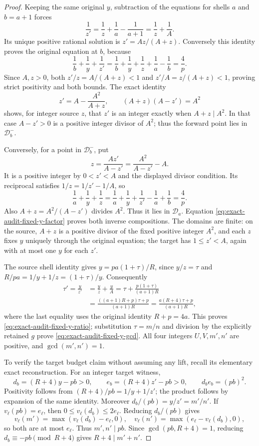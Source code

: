 \begin{proof}
Keeping the same original \(y\), subtraction of the equations for
shells \(a\) and \(b=a+1\) forces
\[
 \frac1{z'}=\frac1z+\frac1a-\frac1{a+1}
           =\frac1z+\frac1A.
\]
Its unique positive rational solution is \(z'=Az/(A+z)\).
Conversely this identity proves the original equation at \(b\),
because
\[
 \frac1b+\frac1y+\frac1{z'}
 =\frac1b+\frac1y+\frac1z+\frac1a-\frac1b=\frac4p.
\]
Since \(A,z>0\), both \(z'/z=A/(A+z)<1\) and
\(z'/A=z/(A+z)<1\), proving strict positivity and both bounds.
The exact identity
\begin{equation}\label{eq:exact-audit-fixed-y-factor}
 z'=A-\frac{A^2}{A+z},\qquad (A+z)(A-z')=A^2
\end{equation}
shows, for integer source \(z\), that \(z'\) is an integer exactly
when \(A+z\mid A^2\). In that case \(A-z'>0\) is a positive
integer divisor of \(A^2\); thus the forward point lies in
\(\mathcal D_b^-\).

Conversely, for a point in \(\mathcal D_b^-\), put
\[
 z=\frac{Az'}{A-z'}=\frac{A^2}{A-z'}-A.
\]
It is a positive integer by \(0<z'<A\) and the displayed divisor
condition. Its reciprocal satisfies \(1/z=1/z'-1/A\), so
\[
 \frac1a+\frac1y+\frac1z
 =\frac1a+\frac1y+\frac1{z'}-\frac1a+\frac1b=\frac4p.
\]
Also \(A+z=A^2/(A-z')\) divides \(A^2\). Thus it lies in
\(\mathcal D_a\). Equation \eqref{eq:exact-audit-fixed-y-factor}
proves both inverse compositions. The domains are finite: on the
source, \(A+z\) is a positive divisor of the fixed positive integer
\(A^2\), and each \(z\) fixes \(y\) uniquely through the original
equation; the target has \(1\le z'<A\), again with at most one
\(y\) for each \(z'\).

The source shell identity gives
\(y=pa(1+\tau)/R\), since \(y/z=\tau\) and
\(R/pa=1/y+1/z=(1+\tau)/y\). Consequently
\begin{align*}
 \tau'=\frac y{z'}
 &=\frac yz+\frac yA
 =\tau+\frac{p(1+\tau)}{(a+1)R}\\
 &=\frac{((a+1)R+p)\tau+p}{(a+1)R}
 =\frac{a(R+4)\tau+p}{(a+1)R},
\end{align*}
where the last equality uses the original identity \(R+p=4a\).
This proves \eqref{eq:exact-audit-fixed-y-ratio}; substitution
\(\tau=m/n\) and division by the explicitly retained \(g\) prove
\eqref{eq:exact-audit-fixed-y-gcd}. All four integers \(U,V,m',n'\)
are positive, and \(\gcd(m',n')=1\).

To verify the target budget claim without assuming any lift, recall its
elementary exact reconstruction. For an integer target witness,
\[
 d_b=(R+4)y-pb>0,\qquad e_b=(R+4)z'-pb>0,\qquad
 d_b e_b=(pb)^2.
\]
Positivity follows from \((R+4)/pb=1/y+1/z'\); the product follows
by expansion of the same identity. Moreover
\(d_b/(pb)=y/z'=m'/n'\). If \(v_\ell(pb)=e_\ell\), then
\(0\le v_\ell(d_b)\le2e_\ell\). Reducing \(d_b/(pb)\) gives
\[
 v_\ell(m')=\max(v_\ell(d_b)-e_\ell,0),\quad
 v_\ell(n')=\max(e_\ell-v_\ell(d_b),0),
\]
so both are at most \(e_\ell\). Thus \(m',n'\mid pb\).
Since \(\gcd(pb,R+4)=1\), reducing
\(d_b\equiv-pb\pmod{R+4}\) gives \(R+4\mid m'+n'\).


\end{proof}
